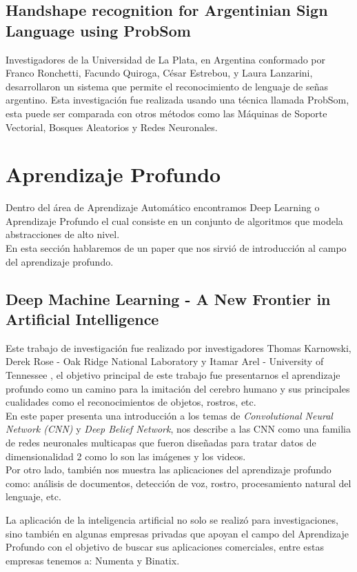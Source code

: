 \subsection{Handshape recognition for Argentinian Sign	Language using ProbSom}
Investigadores de la Universidad de La Plata, en Argentina  conformado por Franco Ronchetti, Facundo Quiroga, César Estrebou, y Laura Lanzarini\cite{HAND}, desarrollaron un sistema que permite el reconocimiento de lenguaje de señas argentino. Esta investigación fue realizada usando una técnica llamada ProbSom, esta puede ser comparada con otros métodos como las Máquinas de Soporte Vectorial, Bosques Aleatorios y Redes Neuronales.
\section{Aprendizaje Profundo}
Dentro del área de Aprendizaje Automático encontramos Deep Learning o Aprendizaje Profundo el cual consiste en un conjunto de algoritmos que modela abstracciones de alto nivel.\\
En esta sección hablaremos de un paper que nos sirvió de introducción al campo del aprendizaje profundo.

\subsection{Deep Machine Learning - A New Frontier in Artificial Intelligence}
Este trabajo de investigación fue realizado por investigadores Thomas	Karnowski, Derek Rose - Oak Ridge National Laboratory y Itamar	Arel - University of Tennessee \cite{DML}, el objetivo principal de este trabajo fue presentarnos el aprendizaje profundo como un camino para la imitación del cerebro humano y sus principales cualidades como el reconocimientos de objetos, rostros, etc.\\
En este paper presenta una introducción a los temas de \textit{Convolutional Neural Network (CNN)} y \textit{Deep Belief Network}, nos describe a las CNN como una familia de redes neuronales multicapas que fueron diseñadas para tratar datos de dimensionalidad 2 como lo son las imágenes y los videos.\\
Por otro lado, también nos muestra las aplicaciones del aprendizaje profundo como: análisis de documentos, detección de voz, rostro, procesamiento natural del lenguaje, etc.

La aplicación de la inteligencia artificial no solo se realizó para investigaciones, sino también en algunas empresas privadas que apoyan el campo del Aprendizaje Profundo con el objetivo de buscar sus aplicaciones comerciales, entre estas empresas tenemos a: Numenta y Binatix.


